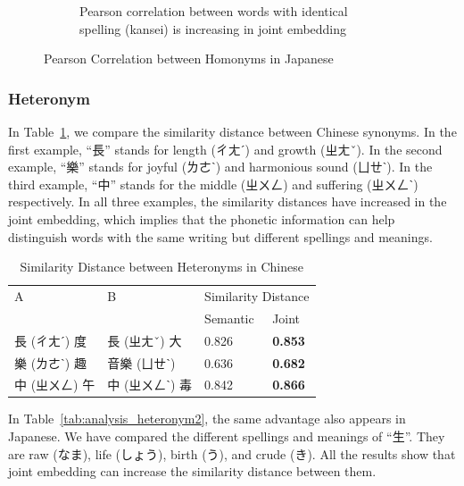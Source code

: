 \begin{figure}[t]
\begin{subfigure}[b]{0.49\textwidth}
        \caption{Pearson correlation between words with identical spelling (kansei) is increasing in joint embedding}
        \label{fig:corr_ja3}
    \end{subfigure}
    \caption{Pearson Correlation between Homonyms in Japanese}
    \label{fig:corr_ja}
\end{figure}

\newpage

\subsubsection{Heteronym}

In Table~\ref{tab:analysis_heteronym1}, we compare the similarity distance between Chinese synonyms. In the first example, ``長'' stands for length (ㄔㄤˊ) and growth (ㄓㄤˇ). In the second example, ``樂'' stands for joyful (ㄌㄜˋ) and harmonious sound (ㄩㄝˋ). In the third example, ``中'' stands for the middle (ㄓㄨㄥ) and suffering (ㄓㄨㄥˋ) respectively. In all three examples, the similarity distances have increased in the joint embedding, which implies that the phonetic information can help distinguish words with the same writing but different spellings and meanings.

\vspace{0.5cm}
\begin{table}[h]
    \centering
        \begin{tabularx}{\textwidth}{bbbb}
            \toprule
            \multirow{2.5}{*}{A} & \multirow{2.5}{*}{B} & \multicolumn{2}{c}{Similarity Distance} \\
            \cmidrule(lr){3-4} {} & {} & Semantic & Joint \\\midrule
            長 (ㄔㄤˊ) 度 & 長 (ㄓㄤˇ) 大 & 0.826 & \textbf{0.853} \\
            樂 (ㄌㄜˋ) 趣 & 音樂 (ㄩㄝˋ) & 0.636 & \textbf{0.682} \\
            中 (ㄓㄨㄥ) 午 & 中 (ㄓㄨㄥˋ) 毒 & 0.842 & \textbf{0.866} \\\bottomrule
        \end{tabularx}
    \caption{Similarity Distance between Heteronyms in Chinese}
    \label{tab:analysis_heteronym1}
\end{table}

\newpage

\begin{CJK}{UTF8}{long}
    In Table~\ref{tab:analysis_heteronym2}, the same advantage also appears in Japanese. We have compared the different spellings and meanings of ``生''. They are raw (なま), life (しょう), birth (う), and crude (き). All the results show that joint embedding can increase the similarity distance between them.
\end{CJK}

